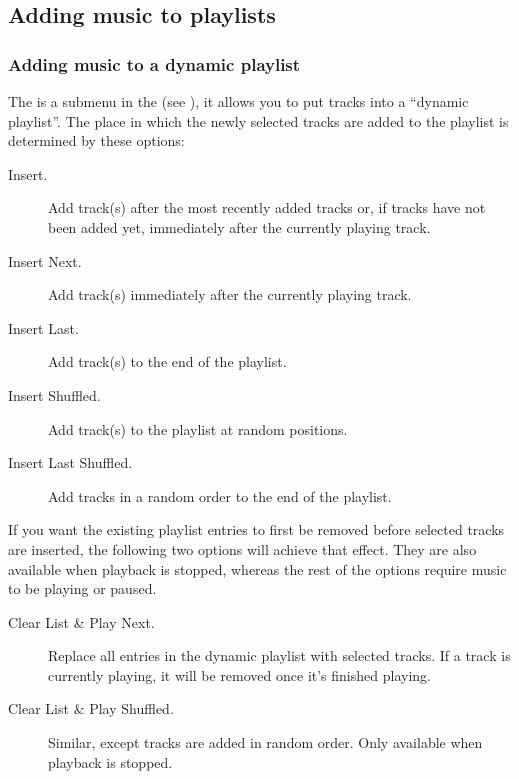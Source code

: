 \subsection{Adding music to playlists}

\subsubsection{\label{ref:currentplaylist_submenu}Adding music to a dynamic playlist}
The  is a submenu in the  (see
), it allows you to put tracks into a
``dynamic playlist''. The place in which the newly
selected tracks are added to the playlist is determined by these
options:

\begin{description}
\item [Insert.] Add track(s) after the most recently added tracks or, if tracks
have not been added yet, immediately after the currently playing track.

\item [Insert Next.] Add track(s) immediately after the currently playing track.

\item [Insert Last.] Add track(s) to the end of the playlist.

\item [Insert Shuffled.] Add track(s) to the playlist at random positions.

\item [Insert Last Shuffled.] Add tracks in a random order to the end of the playlist.
\end{description}

If you want the existing playlist entries to first be removed before
selected tracks are inserted, the following two options will achieve that effect.
They are also available when playback is stopped, whereas the rest of the options
require music to be playing or paused.

\begin{description}
\item [Clear List \& Play Next.] Replace all entries in the dynamic playlist with
selected tracks. If a track is currently playing, it will be removed once it’s
finished playing.

\item [Clear List \& Play Shuffled.] Similar, except tracks are added in random order.
Only available when playback is stopped.
\end{description}

